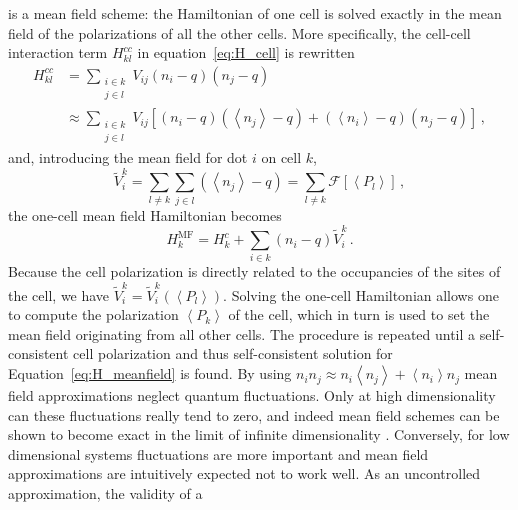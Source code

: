 %
 is a mean field scheme: the Hamiltonian of one cell is solved
exactly in the mean field of the polarizations of all the other cells. More
specifically, the cell-cell interaction term $H^{cc}_{kl}$ in
equation~\eqref{eq:H_cell} is rewritten
\begin{equation}
\begin{split}
  \label{eq:H_kl_meanfield}
  H^{cc}_{kl} 
  &=
  \sum_{\substack{i \in k\\j \in l}} V_{ij} \left( n_i - q \right) \left( n_j - q \right) \\
  &\approx
  \sum_{\substack{i \in k\\j \in l}} V_{ij} 
       \left[ \left( n_i - q \right) \left( \left< n_j \right> - q \right)
              +
              \left( \left< n_i \right> - q \right) \left( n_j - q \right)
       \right] \, ,
\end{split}
\end{equation}
and, introducing the mean field for dot $i$ on cell $k$,
\begin{equation}
  \label{eq:V_meanfield}
  \tilde{V}_i^k
  = \sum_{l \ne k} \sum_{j \in l} \left( \left< n_j \right> - q \right)
  = \sum_{l \ne k} \mathcal{F} \left[ \left< P_l \right> \right] \, ,
\end{equation}
the one-cell mean field Hamiltonian becomes
\begin{equation}
  \label{eq:H_meanfield}
  H^{\mathrm{MF}}_k
  = H^c_k + \sum_{i \in k} \left( n_i - q \right) \tilde{V}_i^k \, .
\end{equation}
Because the cell polarization is directly related to the occupancies of the
sites of the cell, we have $\tilde{V}_i^k = \tilde{V}_i^k(\left<P_l\right>)$.
Solving the one-cell Hamiltonian allows one to compute the polarization $\left<
P_k \right>$ of the cell, which in turn is used to set the mean field
originating from all other cells. The procedure is repeated until a
self-consistent cell polarization and thus self-consistent solution for
Equation~\eqref{eq:H_meanfield} is found. By using $n_i n_j \approx n_i \left<
n_j \right> + \left< n_i \right> n_j$ mean field approximations neglect quantum
fluctuations. Only at high dimensionality can these fluctuations really tend to
zero, and indeed mean field schemes can be shown to become exact in the limit of
infinite dimensionality \cite{Fehske}. Conversely, for low dimensional systems
fluctuations are more important and mean field approximations are intuitively
expected not to work well. As an uncontrolled approximation, the validity of a
